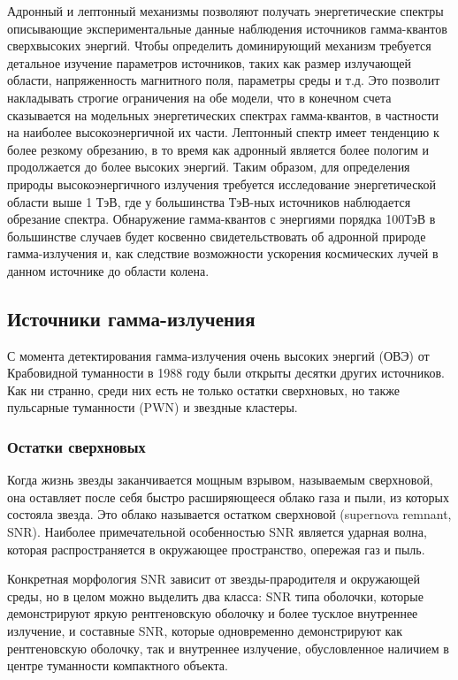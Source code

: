 Адронный и лептонный механизмы позволяют получать энергетические спектры описывающие экспериментальные данные наблюдения источников гамма-квантов сверхвысоких энергий. Чтобы определить доминирующий механизм требуется детальное изучение параметров источников, таких как размер излучающей области, напряженность магнитного поля, параметры среды и т.д. Это позволит накладывать строгие ограничения на обе модели, что в конечном счета сказывается на модельных энергетических спектрах гамма-квантов, в частности на наиболее высокоэнергичной их части.  Лептонный спектр имеет тенденцию к более резкому обрезанию, в то время как адронный является более пологим и продолжается до более высоких энергий. Таким образом, для определения природы высокоэнергичного излучения требуется исследование энергетической области выше 1 ТэВ, где у большинства ТэВ-ных источников наблюдается обрезание спектра. Обнаружение гамма-квантов с энергиями порядка 100ТэВ в большинстве случаев будет косвенно свидетельствовать об адронной природе гамма-излучения и, как следствие возможности ускорения космических лучей в данном источнике до области колена.

\subsection{Источники гамма-излучения}
С момента детектирования гамма-излучения очень высоких энергий (ОВЭ) от Крабовидной туманности в 1988 году были открыты десятки других источников. Как ни странно, среди них есть не только остатки сверхновых, но также пульсарные туманности (PWN) и звездные кластеры.

\subsubsection{Остатки сверхновых}
Когда жизнь звезды заканчивается мощным взрывом, называемым сверхновой, она оставляет после себя быстро расширяющееся облако газа и пыли, из которых состояла звезда. Это облако называется остатком сверхновой (supernova remnant, SNR). Наиболее примечательной особенностью SNR является ударная волна, которая распространяется в окружающее пространство, опережая газ и пыль. 

Конкретная морфология SNR зависит от звезды-прародителя и окружающей среды, но в целом можно выделить два класса: SNR типа оболочки, которые демонстрируют яркую рентгеновскую оболочку и более тусклое внутреннее излучение, и составные SNR, которые одновременно демонстрируют как рентгеновскую оболочку, так и внутреннее излучение, обусловленное наличием в центре туманности компактного объекта. 

